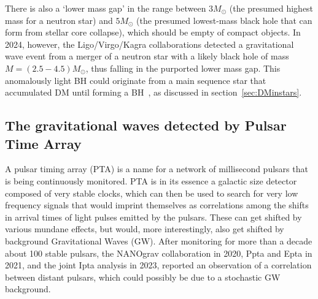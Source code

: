 \medskip


There is also a `lower mass gap' in the range between $3M_\odot$ (the presumed highest mass for a neutron star) and $5M_\odot$ (the presumed lowest-mass black hole that can form from stellar core collapse), which should be empty of compact objects.  
In 2024, however, the {\sc Ligo/Virgo/Kagra} collaborations detected a gravitational wave event from a merger of a neutron star with a likely black hole of mass $M=(2.5-4.5)M_\odot$, thus falling in the purported lower mass gap.
This anomalously light BH could originate from a main sequence star that accumulated DM until forming a BH~\cite{LowMassGap}, as discussed in section~\ref{sec:DMinstars}.







\subsection{The gravitational waves detected by Pulsar Time Array} 
\label{sec:NANOgrav} 
A pulsar timing array (PTA) is a name for a network of millisecond pulsars that is being continuously monitored. PTA is in its essence a galactic size detector composed of very stable clocks, which can then be used to search for very low frequency signals that would imprint themselves as correlations among the shifts in arrival times of light pulses emitted by the pulsars. These can get shifted by various mundane effects, but would, more interestingly, also get shifted
by background Gravitational Waves (GW). After monitoring for more than a decade about 100 stable pulsars, the {\sc NANOgrav} collaboration in 2020,  {\sc Ppta}  and {\sc Epta} in 2021, and the joint {\sc Ipta} analysis in 2023, reported an observation of 
a correlation between distant pulsars, which could 
possibly be due to  a stochastic GW background.

